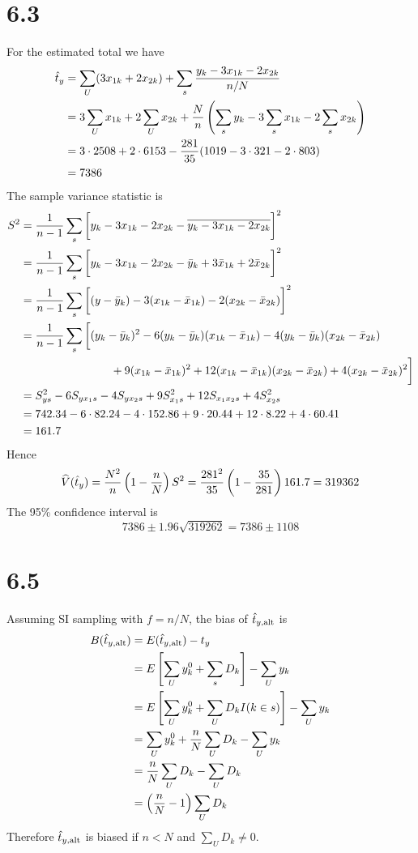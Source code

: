 \documentclass[12pt]{article}
\begin{document}
\section*{6.3}
For the estimated total we have
%
\begin{align*}
\hat t_y
&=
\sum_U(3x_{1k}+2x_{2k})+\sum_s{y_k-3x_{1k}-2x_{2k}\over n/N}\\
&=
3\sum_Ux_{1k}+2\sum_Ux_{2k}+{N\over n}\left(
\sum_sy_k-3\sum_sx_{1k}-2\sum_sx_{2k}\right)\\
&=
3\cdot2508+2\cdot6153-{281\over35}(1019-3\cdot321-2\cdot803)\\
&=
7386
\end{align*}
%
The sample variance statistic is
%
\begin{align*}
S^2
&=
{1\over n-1}\sum_s\bigg[y_k-3x_{1k}-2x_{2k}-\overline{y_k-3x_{1k}-2x_{2k}}\bigg]^2\\
&=
{1\over n-1}\sum_s\bigg[y_k-3x_{1k}-2x_{2k}-\bar y_k+3\bar x_{1k}+2\bar x_{2k}\bigg]^2\\
&=
{1\over n-1}\sum_s\bigg[
(y-\bar y_k)-3(x_{1k}-\bar x_{1k})-2(x_{2k}-\bar x_{2k})\bigg]^2\\
&=
{1\over n-1}\sum_s\bigg[(y_k-\bar y_k)^2-6(y_k-\bar y_k)(x_{1k}-\bar x_{1k})
-4(y_k-\bar y_k)(x_{2k}-\bar x_{2k})\\
&\qquad\qquad\qquad\qquad
{}+9(x_{1k}-\bar x_{1k})^2+12(x_{1k}-\bar x_{1k})(x_{2k}-\bar x_{2k})
+4(x_{2k}-\bar x_{2k})^2\bigg]\\
&=
S_{ys}^2-6S_{yx_1s}-4S_{yx_2s}+9S_{x_1s}^2+12S_{x_1x_2s}+4S_{x_2s}^2\\
&=
742.34-6\cdot82.24-4\cdot152.86
+9\cdot20.44+12\cdot8.22+4\cdot60.41\\
&=161.7
\end{align*}
%
Hence
%
\[
\widehat V(\hat t_y)={N^2\over n}\left(1-{n\over N}\right)S^2
={281^2\over35}\left(1-{35\over281}\right)161.7
=319362
\]
%
The 95\% confidence interval is
%
\[
7386\pm1.96\sqrt{319262}=7386\pm1108
\]


\section*{6.5}
Assuming SI sampling with $f=n/N$, the bias of $\hat t_{y,\rm alt}$ is
\begin{align*}
B(\hat t_{y,\rm alt})
&=
E(\hat t_{y,\rm alt})-t_y\\
&=
E\left[
\sum_Uy_k^0+\sum_sD_k\right]-\sum_Uy_k\\
&=
E\left[\sum_Uy_k^0+\sum_UD_kI(k\in s)\right]-\sum_Uy_k\\
&=
\sum_Uy_k^0+{n\over N}\sum_UD_k-\sum_Uy_k\\
&=
{n\over N}\sum_UD_k-\sum_UD_k\\
&=
\left({n\over N}-1\right)\sum_UD_k
\end{align*}
Therefore $\hat t_{y,\rm alt}$ is biased if $n<N$ and $\sum_UD_k\ne0$.
\end{document}
